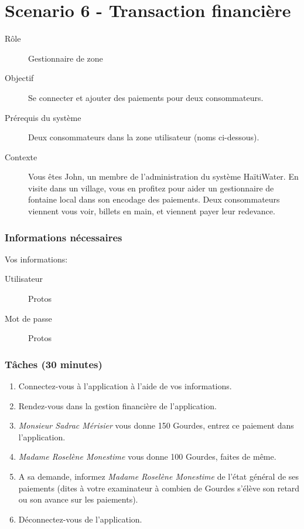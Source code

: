 \documentclass[a4paper, 11pt]{article}
\begin{document}
\newpage

\section*{Scenario 6 - Transaction financière}
    \begin{description}
        \item[Rôle] Gestionnaire de zone
        \item[Objectif] Se connecter et ajouter des paiements pour deux consommateurs.
        \item[Prérequis du système] Deux consommateurs dans la zone utilisateur (noms ci-dessous).
        \item[Contexte] Vous êtes John, un membre de l'administration du système HaïtiWater. En visite dans un village, vous en profitez pour aider un gestionnaire de fontaine local dans son encodage des paiements. Deux consommateurs viennent vous voir, billets en main, et viennent payer leur redevance.
    \end{description}

    \subsubsection*{Informations nécessaires}
    Vos informations:
    \begin{description}
        \item[Utilisateur] Protos
        \item[Mot de passe] Protos
    \end{description}

    \subsubsection*{Tâches (30 minutes)}
        \begin{enumerate}
            \item Connectez-vous à l'application à l'aide de vos informations.
            \item Rendez-vous dans la gestion financière de l'application.
            \item \emph{Monsieur Sadrac Mérisier} vous donne 150 Gourdes, entrez ce paiement dans l'application.
            \item \emph{Madame Roselène Monestime} vous donne 100 Gourdes, faites de même.
            \item A sa demande, informez \emph{Madame Roselène Monestime} de l'état général de ses paiements (dites à votre examinateur à combien de Gourdes s'élève son retard ou son avance sur les paiements).
            \item Déconnectez-vous de l'application.
        \end{enumerate}
\end{document}
